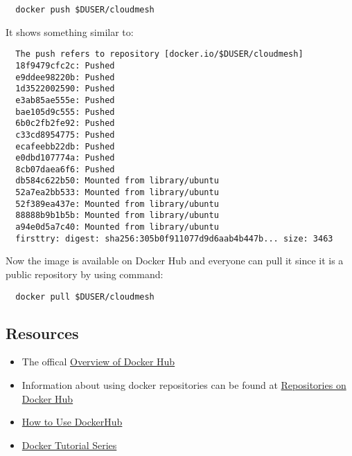 \begin{itemize}
\begin{lstlisting}
  docker push $DUSER/cloudmesh
\end{lstlisting}

  It shows something similar to:

\begin{lstlisting}
  The push refers to repository [docker.io/$DUSER/cloudmesh]
  18f9479cfc2c: Pushed 
  e9ddee98220b: Pushed 
  1d3522002590: Pushed 
  e3ab85ae555e: Pushed 
  bae105d9c555: Pushed 
  6b0c2fb2fe92: Pushed 
  c33cd8954775: Pushed 
  ecafeebb22db: Pushed 
  e0dbd107774a: Pushed 
  8cb07daea6f6: Pushed 
  db584c622b50: Mounted from library/ubuntu 
  52a7ea2bb533: Mounted from library/ubuntu 
  52f389ea437e: Mounted from library/ubuntu 
  88888b9b1b5b: Mounted from library/ubuntu 
  a94e0d5a7c40: Mounted from library/ubuntu 
  firsttry: digest: sha256:305b0f911077d9d6aab4b447b... size: 3463
\end{lstlisting}

  Now the image is available on Docker Hub and everyone can pull it
  since it is a public repository by using command:

\begin{lstlisting}
  docker pull $DUSER/cloudmesh
\end{lstlisting}
\end{itemize}

\subsection{Resources}

\begin{itemize}
\item
  The offical
  \href{https://docs.docker.com/docker-hub/\#use-official-repositories}{Overview
  of Docker Hub} \cite{hid-sp18-405-tutorial-dockerhub-overview}
\item
  Information about using docker repositories can be found at
  \href{https://docs.docker.com/docker-hub/repos/}{Repositories on
  Docker Hub} \cite{hid-sp18-405-tutorial-dockerhub-repository}
\item
   \href{https://www.linux.com/blog/learn/intro-to-linux/2018/1/how-use-dockerhub}{How
  to Use DockerHub} \cite{hid-sp18-405-tutorial-dockerhub-blog-use}

\item \href{https://rominirani.com/docker-tutorial-series-part-4-docker-hub-b51fb545dd8e}{Docker
  Tutorial Series}\cite{docker-tutorial-series-part-4}
\end{itemize}



